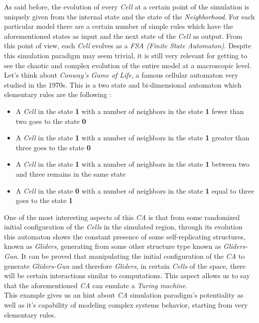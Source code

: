 \documentclass[12pt,a4paper,fleqn]{report}
\begin{document}
As said before, the evolution of every \textit{Cell} at a certain point of the simulation is uniquely given from the internal state and the state of the \textit{Neighborhood}. For each particular model there are a certain number of simple rules which have the aforementioned states as input and the next state of the \textit{Cell} as output. From this point of view, each \textit{Cell} evolves as a \textit{FSA (Finite State Automaton)}. Despite this simulation paradigm may seem trivial, it is still very relevant for getting to see the chaotic and complex evolution of the entire model at a macroscopic level.\\
Let's think about \textit{Conway's Game of Life}, a famous cellular automaton very studied in the 1970s. This is a two state and bi-dimensional automaton which elementary rules are the following :
\begin{itemize}
\item
A \textit{Cell} in the state \textbf{1} with a number of neighbors in the state \textbf{1} fewer than two goes to the state \textbf{0}
\item
A \textit{Cell} in the state \textbf{1} with a number of neighbors in the state \textbf{1} greater than three goes to the state \textbf{0} 
\item
A \textit{Cell} in the state \textbf{1} with a number of neighbors in the state \textbf{1} between two and three remains in the same state
\item
A \textit{Cell} in the state \textbf{0} with a number of neighbors in the state \textbf{1} equal to three goes to the state \textbf{1}
\end{itemize}
One of the most interesting aspects of this \textit{CA} is that from some randomized initial configuration of the \textit{Cells} in the simulated region, through its evolution this automaton shows the constant presence of some self-replicating structures, known as \textit{Gliders}, generating from some other structure type known as \textit{Gliders-Gun}. It can be proved that manipulating the initial configuration of the \textit{CA} to generate \textit{Gliders-Gun} and therefore \textit{Gliders}, in certain \textit{Cells} of the space, there will be certain interactions similar to computations. This aspect allows us to say that the aforementioned \textit{CA} can emulate a \textit{Turing machine}.\\
This example gives us an hint about \textit{CA} simulation paradigm's potentiality as well as it's capability of modeling complex systems behavior, starting from very elementary rules.
\end{document}
